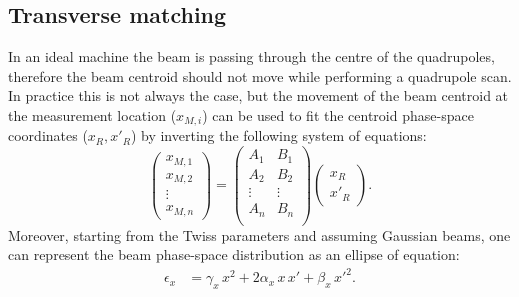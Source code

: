 

\subsection{Transverse matching}
%
In an ideal machine the beam is passing through the centre of the quadrupoles, 
therefore the beam centroid should not move while performing a quadrupole scan.
In practice this is not always the case,
but the movement of the beam centroid at the measurement location ($x_{M,i}$) 
can be used to fit the centroid phase-space coordinates ($x_R, x'_R$) 
by inverting the following system of equations: 
\begin{equation}
\begin{pmatrix}
  x_{M,1} \\
  x_{M,2} \\
  \vdots \\
  x_{M,n} 
\end{pmatrix}
= 
 \begin{pmatrix}
  A_1 & B_1 \\
  A_2 & B_2 \\
  \vdots & \vdots \\
  A_n & B_n \\
  \end{pmatrix} 
\begin{pmatrix}
  x_R \\
  x'_R 
\end{pmatrix}.
\label{eq:dataCollectionCentroide}
\end{equation}
%
Moreover, starting from the Twiss parameters and assuming Gaussian beams, 
one can represent the beam phase-space distribution as an ellipse of equation:
%
\begin{align}
\epsilon_x &= \gamma_x \, x^2 + 2 \alpha_x \, x \, x' + \beta_x \, x'^2.
\end{align}
%


